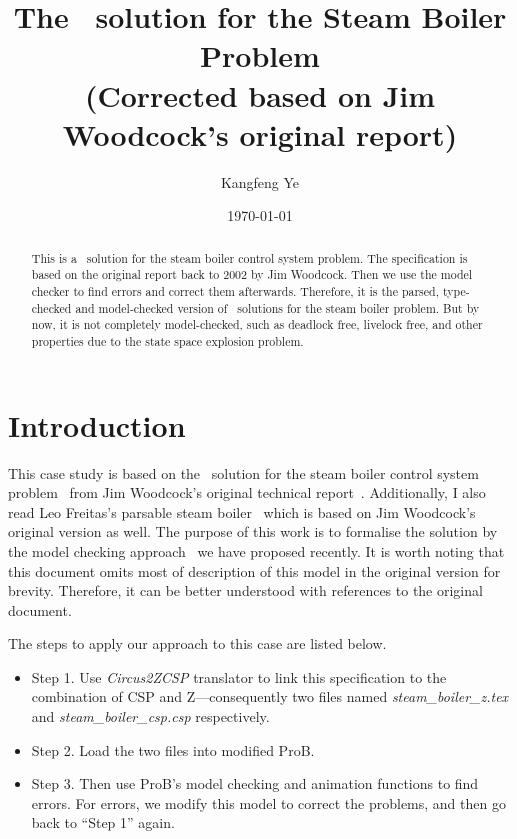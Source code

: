 \documentclass{report} %
\newcommand{\I}[1]{\textit{#1}}
\begin{document}


\title{The \Circus\ solution for the Steam Boiler Problem \\ (Corrected based on Jim Woodcock's original report)}
\author{Kangfeng Ye}
\date{\today}

\maketitle

\begin{abstract}
   \noindent This is a \Circus\ solution for the steam boiler control system problem. The specification is based on the original report back to 2002 by Jim Woodcock. Then we use the model checker to find errors and correct them afterwards. Therefore, it is the parsed, type-checked and model-checked version of \Circus\ solutions for the steam boiler problem. But by now, it is not completely model-checked, such as deadlock free, livelock free, and other properties due to the state space explosion problem.
\end{abstract}


\newpage %

\tableofcontents %

\newpage %

\chapter{Introduction}

This case study is based on the \Circus\ solution for the steam boiler control system problem~\cite{Abrial1995} from Jim Woodcock's original technical report~\cite{Woodcock2001a}. Additionally, I also read Leo Freitas's parsable steam boiler~\cite{Freitas2006} which is based on Jim Woodcock's original version as well. The purpose of this work is to formalise the solution by the model checking approach~\cite{Ye2015} we have proposed recently. It is worth noting that this document omits most of description of this model in the original version for brevity. Therefore, it can be better understood with references to the original document. 

The steps to apply our approach to this case are listed below. 
\begin{itemize}
    \item Step 1. Use \I{Circus2ZCSP} translator to link this specification to the combination of CSP and Z---consequently two files named \emph{steam\_boiler\_z.tex} and \emph{steam\_boiler\_csp.csp} respectively.
    \item Step 2. Load the two files into modified ProB. 
    \item Step 3. Then use ProB's model checking and animation functions to find errors. For errors, we modify this model to correct the problems, and then go back to ``Step 1'' again.
\end{itemize}
\end{document}
